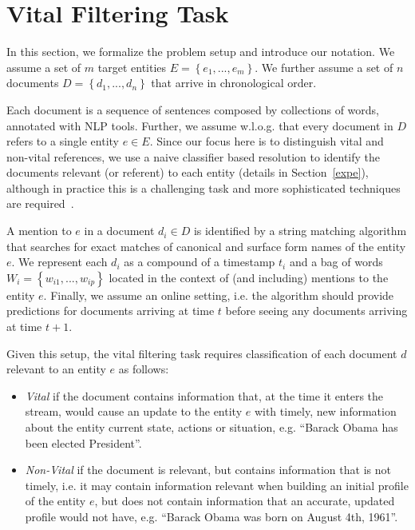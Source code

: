 \documentclass{article}
\begin{document}
\section{Vital Filtering Task}
\label{background}

In this section, we formalize the problem setup and introduce our notation. 
We assume a set of $m$ target entities $E = \left\{ {e_1, ..., e_m}\right\}$. We further assume a set of $n$ documents $D = \left\{ {d_{1}, ..., d_{n}}\right\}$ that arrive in chronological order. 
 
Each document is a sequence of sentences composed by collections of words, annotated with NLP tools.
Further, we assume w.l.o.g. that every document in $D$ refers to a single entity $e \in E$. %
Since our focus here is to distinguish vital and non-vital references, we use a naive classifier based resolution to identify the documents relevant (or referent) to each entity (details in Section~\ref{expe}), although in practice this is a challenging task and more sophisticated techniques are required~\citep{RaoMD10,singh11:acl}.

A mention to $e$ in a document $d_i \in D$ is identified by a string matching algorithm that searches for exact matches of canonical and surface form names of the entity $e$.
We represent each $d_i$ as a compound of a timestamp $t_i$ and a bag of words $W_i = \left\{ {w_{i1}, ..., w_{ip}}\right\}$ located in the context of (and including) mentions to the entity $e$. 
Finally, we assume an online setting, i.e. the algorithm should provide predictions for documents arriving at time $t$ before seeing any documents arriving at time $t+1$.

Given this setup, the vital filtering task requires classification of each document $d$ relevant to an entity $e$ as follows:
\begin{itemize}[nosep]
    \item \emph{Vital} if the document contains information that, at the time it enters the stream, would cause an update to the entity $e$ with timely, new information about the entity current state, actions or situation, e.g. ``Barack Obama has been elected President''.
    \item \emph{Non-Vital} if the document is relevant, but contains information that is not timely, i.e. it may contain information relevant when building an initial profile of the entity $e$, but does not contain information that an accurate, updated profile would not have, e.g. ``Barack Obama was born on August 4th, 1961''.
\end{itemize}
\end{document}

